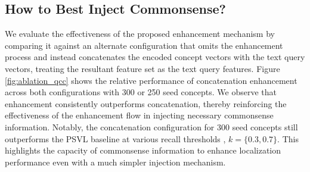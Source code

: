 \subsection{How to Best Inject Commonsense?}
\label{ablation:qcc}
We evaluate the effectiveness of the proposed enhancement mechanism by comparing it against an alternate configuration that omits the enhancement process and instead concatenates the encoded concept vectors with the text query vectors, treating the resultant feature set as the text query features. Figure \ref{fig:ablation_qcc} shows the relative performance of concatenation \vs enhancement across both \modelname configurations with  300 or 250 seed concepts. We observe that enhancement consistently outperforms concatenation, thereby reinforcing the effectiveness of the enhancement flow in injecting necessary commonsense information. Notably, the concatenation configuration for 300 seed concepts still outperforms the PSVL baseline at various recall thresholds \ie, $k=\{0.3, 0.7\}$. This highlights the capacity of commonsense information to enhance localization performance even with a much simpler injection mechanism.
